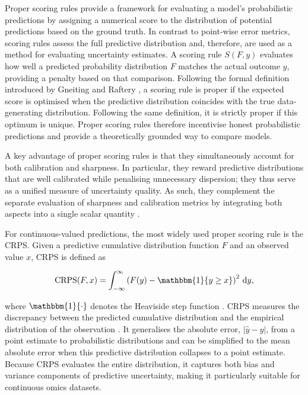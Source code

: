 Proper scoring rules provide a framework for evaluating a model's probabilistic predictions by assigning a numerical score to the distribution of potential predictions based on the ground truth. In contrast to point-wise error metrics, scoring rules assess the full predictive distribution and, therefore, are used as a method for evaluating uncertainty estimates. A scoring rule $S(F,y)$ evaluates how well a predicted probability distribution $F$ matches the actual outcome $y$, providing a penalty based on that comparison. Following the formal definition introduced by Gneiting and Raftery \citep{Gneiting2007Scoring}, a scoring rule is proper if the expected score is optimised when the predictive distribution coincides with the true data-generating distribution. Following the same definition, it is strictly proper if this optimum is unique. Proper scoring rules therefore incentivise honest probabilistic predictions and provide a theoretically grounded way to compare models.

A key advantage of proper scoring rules is that they simultaneously account for both calibration and sharpness. In particular, they reward predictive distributions that are well calibrated while penalising unnecessary dispersion; they thus serve as a unified measure of uncertainty quality. As such, they complement the separate evaluation of sharpness and calibration metrics by integrating both aspects into a single scalar quantity \citep{Gneiting2007Scoring, Gneiting2014Probabilistic}.

For continuous-valued predictions, the most widely used proper scoring rule is the \gls{CRPS}. Given a predictive cumulative distribution function $F$ and an observed value $x$, CRPS is defined as

\begin{equation}
\mathrm{CRPS}(F,x) = \int_{-\infty}^{\infty} \left( F(y) - \mathbbm{1}\{y \ge x\} \right)^2 \, \mathrm{d}y,
\end{equation}

where $\mathbbm{1}\{\cdot\}$ denotes the Heaviside step function \cite{Hersbach2000Decomposition}. CRPS measures the discrepancy between the predicted cumulative distribution and the empirical distribution of the observation \citep{Matheson1976Scoring}. It generalises the absolute error, $|\hat{y}-y|$, from a point estimate to probabilistic distributions and can be simplified to the mean absolute error when this predictive distribution collapses to a point estimate.
Because CRPS evaluates the entire distribution, it captures both bias and variance components of predictive uncertainty, making it particularly suitable for continuous omics datasets.

